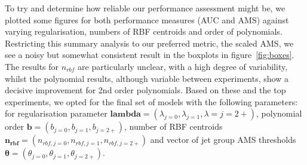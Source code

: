 

To try and determine how reliable our performance assessment might be, we plotted some figures for both performance measures (AUC and AMS) against varying regularisation, numbers of RBF centroids and order of polynomials. Restricting this summary analysis to our preferred metric, the scaled AMS, we see a noisy but somewhat consistent result in the boxplots in figure~\ref{fig:boxes}. The results for $n_{rbf}$ are particularly unclear, with a high degree of variability, whilst the polynomial results, although variable between experiments, show a decisive improvement for 2nd order polynomials. Based on these and the top experiments, we opted for the final set of models with the following parameters:
for regularisation parameter $\bm{lambda}=(\lambda_{j=0}, \lambda_{j=1}, \lambda={j=2+})$, polynomial order $\bm{b}=(b_{j=0}, b_{j=1}, b_{j=2+})$, number of RBF centroids $\bm{n_{rbf}}=(n_{rbf,j=0}, n_{rbf,j=1}, n_{rbf,j=2+})$ and vector of jet group AMS thresholds $\bm{\theta} = (\theta_{j=0}, \theta_{j=1}, \theta_{j=2+})$.

